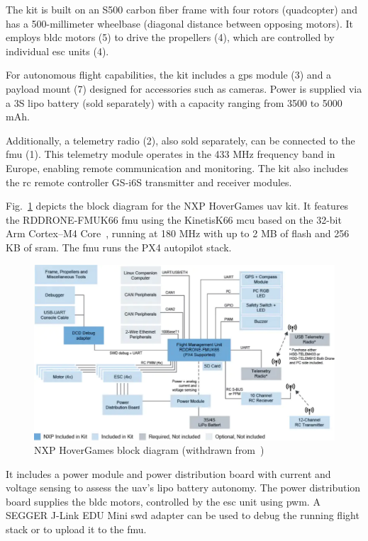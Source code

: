 The kit is built on an S500 carbon fiber frame with four rotors (quadcopter) and has a 500-millimeter wheelbase (diagonal distance between opposing motors). It employs \gls{bldc} motors (5) to drive the propellers (4), which are controlled by individual \gls{esc} units (4).

For autonomous flight capabilities, the kit includes a \gls{gps} module (3) and a payload mount (7) designed for accessories such as cameras. Power is supplied via a 3S \gls{lipo} battery (sold separately) with a capacity ranging from 3500 to 5000 mAh.

Additionally, a telemetry radio (2), also sold separately, can be connected to
the \gls{fmu} (1). This telemetry module operates in the 433 MHz frequency band
in Europe, enabling remote communication and monitoring.
%
The kit also includes the \gls{rc} remote
controller GS-i6S transmitter and receiver modules.

Fig.~\ref{fig:hoverGames-blkDiag} depicts the block diagram for the NXP
HoverGames \gls{uav} kit.  It features the RDDRONE-FMUK66 \gls{fmu} using the
Kinetis\textreg K66 \gls{mcu} based on the 32-bit Arm\textreg
Cortex\textreg--M4 Core~\cite{nxp-hoverGames-fmu}, running at 180 MHz
with up to 2 MB of flash and 256 KB of \gls{sram}. The \gls{fmu} runs the PX4
autopilot stack.

\begin{figure}[!hbt]
  \centering
  \includegraphics[width=1.0\textwidth]{./img/pdf/hoverGames-blkDiag.pdf} 
  \caption[NXP HoverGames block diagram]{NXP HoverGames block diagram (withdrawn from~\cite{nxp-hoverGames-uav})\footnotemark}%
  \label{fig:hoverGames-blkDiag}
\end{figure}
%

It includes a power module and power distribution
board with current and voltage sensing to assess the \gls{uav}'s \gls{lipo}
battery autonomy. The power distribution board supplies the \gls{bldc} motors,
controlled by the \gls{esc} unit using \gls{pwm}. A SEGGER J-Link EDU Mini \gls{swd} adapter can
be used to debug the running flight stack or to upload it to the \gls{fmu}. 

